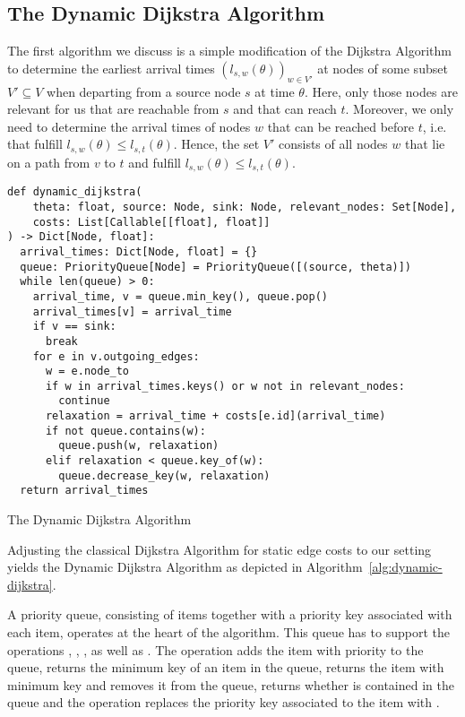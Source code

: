 \subsection{The Dynamic Dijkstra Algorithm}

The first algorithm we discuss is a simple modification of the Dijkstra Algorithm to determine the earliest arrival times $(l_{s,w}(\theta))_{w\in V'}$ at nodes of some subset $V'\subseteq V$ when departing from a source node $s$ at time $\theta$.
Here, only those nodes are relevant for us that are reachable from $s$ and that can reach $t$.
Moreover, we only need to determine the arrival times of nodes $w$ that can be reached before $t$, i.e. that fulfill $l_{s,w}(\theta) \leq l_{s,t}(\theta)$.
Hence, the set $V'$ consists of all nodes $w$ that lie on a path from $v$ to $t$ and fulfill $l_{s,w}(\theta) \leq l_{s,t}(\theta)$.

\begin{algorithm}[ht]
\begin{verbatim}
def dynamic_dijkstra(
    theta: float, source: Node, sink: Node, relevant_nodes: Set[Node],
    costs: List[Callable[[float], float]]
) -> Dict[Node, float]:
  arrival_times: Dict[Node, float] = {}
  queue: PriorityQueue[Node] = PriorityQueue([(source, theta)])
  while len(queue) > 0:
    arrival_time, v = queue.min_key(), queue.pop()
    arrival_times[v] = arrival_time
    if v == sink:
      break
    for e in v.outgoing_edges:
      w = e.node_to
      if w in arrival_times.keys() or w not in relevant_nodes:
        continue
      relaxation = arrival_time + costs[e.id](arrival_time)
      if not queue.contains(w):
        queue.push(w, relaxation)
      elif relaxation < queue.key_of(w):
        queue.decrease_key(w, relaxation)
  return arrival_times
\end{verbatim}
\caption{The Dynamic Dijkstra Algorithm}
\label{alg:dynamic-dijkstra}
\end{algorithm}

Adjusting the classical Dijkstra Algorithm for static edge costs to our setting yields the Dynamic Dijkstra Algorithm as depicted in Algorithm~\ref{alg:dynamic-dijkstra}.

A priority queue, consisting of items together with a priority key associated with each item, operates at the heart of the algorithm.
This queue has to support the operations , , ,  as well as .
The operation  adds the item  with priority  to the queue,  returns the minimum key of an item in the queue,  returns the item with minimum key and removes it from the queue,  returns whether  is contained in the queue and the operation  replaces the priority key associated to the item  with .



